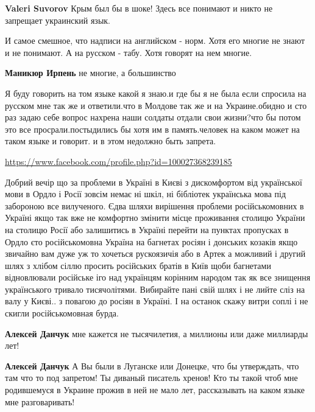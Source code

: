 \begin{itemize}

\textbf{Valeri Suvorov} Крым был бы в шоке! Здесь все понимают и никто не
запрещает украинский язык.


И самое смешное, что надписи на английском - норм. Хотя его многие не знают и
не понимают. А на русском - табу. Хотя говорят на нем многие.

\textbf{Маникюр Ирпень} не многие, а большинство


Я буду говорить на том языке какой я знаю.и где бы я не была если спросила на
русском мне так же и ответили.что в Молдове так же и на Украине.обидно и сто
раз задаю себе вопрос нахрена наши солдаты отдали свои жизни?что бы потом это
все просрали.постыдились бы хотя им в память.человек на каком может на таком
языке и говорит. и в этом недолжно быть запрета.

\url{https://www.facebook.com/profile.php?id=100027368239185}

Добрий вечір що за проблеми в Україні в Києві з дискомфортом від української
мови в Ордло і Росії зовсім немає ні шкіл, ні бібліотек українська мова під
забороною все вилученого. Єдва шляхи вирішення проблеми російськомовних в
Україні якщо так вже не комфортно змінити місце проживання столицю України на
столицю Росії або залишитись в Україні перейти на пунктах пропусках в Ордло єто
російськомовна Україна на багнетах росіян і донських козаків якщо звичайно вам
дуже уж то хочеться рускоязичія або в Артек а можливий і другий шлях з хлібом
сіллю просить російських братів в Київ щоби багнетами відновлювали російське
іго над українцям корінним народом так як все знищення українського тривало
тисячолітями. Вибирайте пані свій шлях і не лийте сліз на валу у Києві.. з
повагою до росіян в Україні. І на останок скажу витри соплі і не скигли
російськомовная бурда.

\begin{itemize}

\textbf{Алексей Данчук} мне кажется не тысячилетия, а миллионы или даже миллиарды лет!

\textbf{Алексей Данчук} А Вы были в Луганске или Донецке, что бы утверждать,
что там что то под запретом! Ты диваный писатель хренов! Кто ты такой чтоб мне
родившемуся в Украине прожив в ней не мало лет, рассказывать на каком языке мне
разговаривать!


\end{itemize}
\end{itemize}
